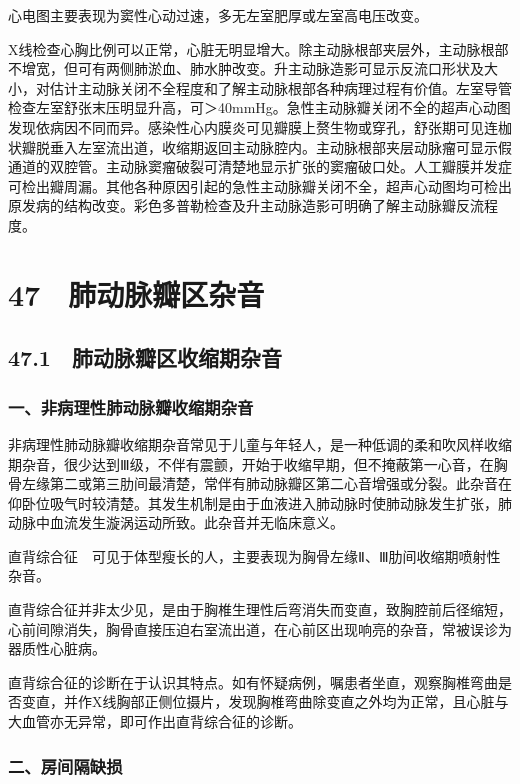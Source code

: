 心电图主要表现为窦性心动过速，多无左室肥厚或左室高电压改变。

X线检查心胸比例可以正常，心脏无明显增大。除主动脉根部夹层外，主动脉根部不增宽，但可有两侧肺淤血、肺水肿改变。升主动脉造影可显示反流口形状及大小，对估计主动脉关闭不全程度和了解主动脉根部各种病理过程有价值。左室导管检查左室舒张末压明显升高，可＞40mmHg。急性主动脉瓣关闭不全的超声心动图发现依病因不同而异。感染性心内膜炎可见瓣膜上赘生物或穿孔，舒张期可见连枷状瓣脱垂入左室流出道，收缩期返回主动脉腔内。主动脉根部夹层动脉瘤可显示假通道的双腔管。主动脉窦瘤破裂可清楚地显示扩张的窦瘤破口处。人工瓣膜并发症可检出瓣周漏。其他各种原因引起的急性主动脉瓣关闭不全，超声心动图均可检出原发病的结构改变。彩色多普勒检查及升主动脉造影可明确了解主动脉瓣反流程度。

\protect\hypertarget{text00129.html}{}{}

\section{47　肺动脉瓣区杂音}

\subsection{47.1　肺动脉瓣区收缩期杂音}

\subsubsection{一、非病理性肺动脉瓣收缩期杂音}

非病理性肺动脉瓣收缩期杂音常见于儿童与年轻人，是一种低调的柔和吹风样收缩期杂音，很少达到Ⅲ级，不伴有震颤，开始于收缩早期，但不掩蔽第一心音，在胸骨左缘第二或第三肋间最清楚，常伴有肺动脉瓣区第二心音增强或分裂。此杂音在仰卧位吸气时较清楚。其发生机制是由于血液进入肺动脉时使肺动脉发生扩张，肺动脉中血流发生漩涡运动所致。此杂音并无临床意义。

直背综合征　可见于体型瘦长的人，主要表现为胸骨左缘Ⅱ、Ⅲ肋间收缩期喷射性杂音。

直背综合征并非太少见，是由于胸椎生理性后弯消失而变直，致胸腔前后径缩短，心前间隙消失，胸骨直接压迫右室流出道，在心前区出现响亮的杂音，常被误诊为器质性心脏病。

直背综合征的诊断在于认识其特点。如有怀疑病例，嘱患者坐直，观察胸椎弯曲是否变直，并作X线胸部正侧位摄片，发现胸椎弯曲除变直之外均为正常，且心脏与大血管亦无异常，即可作出直背综合征的诊断。

\subsubsection{二、房间隔缺损}

